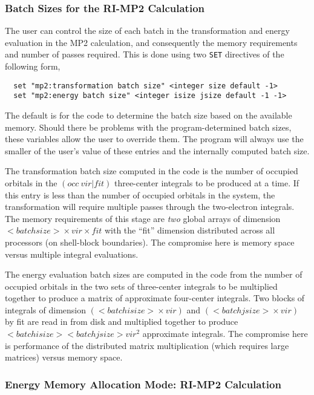 \subsubsection{Batch Sizes for the RI-MP2 Calculation}

The user can control the size of each batch in the transformation and
energy evaluation in the MP2 calculation, and consequently the memory
requirements and number of passes required.  This is done using two
\verb+SET+ directives of the following form,

\begin{verbatim}
  set "mp2:transformation batch size" <integer size default -1>
  set "mp2:energy batch size" <integer isize jsize default -1 -1>
\end{verbatim}

The default is for the code to determine the batch size based on the
available memory.  Should there be problems with the
program-determined batch sizes, these variables allow the user to
override them.  The program will always use the smaller of the user's
value of these entries and the internally computed batch size.

The transformation batch size computed in the code is the number of
occupied orbitals in the $({occ}\ {vir} | {fit})$ three-center
integrals to be produced at a time.  If this entry is less than the
number of occupied orbitals in the system, the transformation will
require multiple passes through the two-electron integrals.  The
memory requirements of this stage are {\em two} global arrays of
dimension ${<batch size>}\times {vir} \times {fit}$ with the ``fit''
dimension distributed across all processors (on shell-block
boundaries).  The compromise here is memory space versus multiple
integral evaluations.

The energy evaluation batch sizes are computed in the code from the
number of occupied orbitals in the two sets of three-center
integrals to be multiplied together to produce a matrix of approximate
four-center integrals.  Two blocks of integrals of dimension $({<batch
  isize>}\times {vir})$ and $({<batch jsize>}\times {vir})$ by fit are
read in from disk and multiplied together to produce $<batch isize>
<batch jsize> {vir}^2$ approximate integrals.  The compromise here is
performance of the distributed matrix multiplication (which requires
large matrices) versus memory space.

\subsubsection{Energy Memory Allocation Mode: RI-MP2 Calculation}

